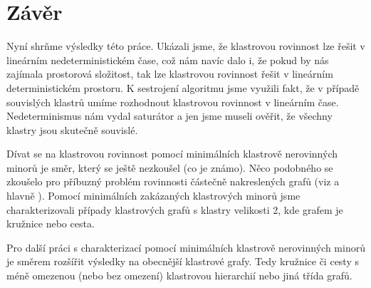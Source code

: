 \documentclass[12pt,a4report]{report}
\begin{document}
\author{Filip Šedivý}

\chapter{Závěr}

Nyní shrňme výsledky této práce. Ukázali jsme, že klastrovou rovinnost lze řešit v lineárním nedeterministickém čase, což nám navíc dalo i, že pokud by nás zajímala prostorová složitost, tak lze klastrovou rovinnost řešit v lineárním deterministickém prostoru.  K sestrojení algoritmu jsme využili fakt, že v případě souvislých klastrů umíme rozhodnout klastrovou rovinnost v lineárním čase. Nedeterminismus nám vydal saturátor a jen jsme museli ověřit, že všechny klastry jsou skutečně souvislé.

Dívat se na klastrovou rovinnost pomocí minimálních klastrově nerovinných minorů je směr, který se ještě nezkoušel (co je známo). Něco podobného se zkoušelo pro příbuzný problém rovinnosti částečně nakreslených grafů (viz \cite{AngeliniEtAl10} a hlavně \cite{JelinekEtAl10}). Pomocí minimálních zakázaných klastrových minorů jsme charakterizovali případy klastrových grafů s klastry velikosti 2, kde grafem je kružnice nebo cesta.

Pro další práci s charakterizací pomocí minimálních klastrově nerovinných minorů je směrem rozšířit výsledky na obecnější klastrové grafy.  Tedy kružnice či cesty s méně omezenou (nebo bez omezení) klastrovou hierarchií nebo jiná třída grafů.
\end{document}
